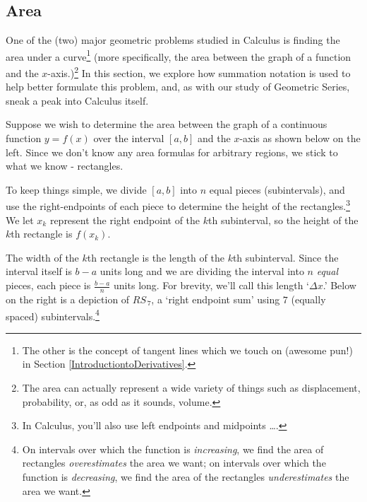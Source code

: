 \documentclass{ximera}
\begin{document}
\subsection{Area}
\label{AreabySum}

One of the (two) major geometric problems studied in Calculus is finding the area under a curve\footnote{The other is the concept of tangent lines which we touch on (awesome pun!) in Section \ref{IntroductiontoDerivatives}.}  (more specifically, the area between the graph of a function and the $x$-axis.)\footnote{The area can actually represent a wide variety of things such as displacement, probability, or, as odd as it sounds, volume.}  In this section, we explore how summation notation is used to help better formulate this problem, and, as with our study of Geometric Series, sneak a peak into Calculus itself.

\medskip

Suppose we wish to determine the area between the graph of a continuous function $y = f(x)$  over the interval  $[a,b]$ and the $x$-axis as shown below on the left.  Since we don't know any area formulas for arbitrary regions, we stick to what we know - rectangles.  

\medskip

To keep things simple, we  divide $[a,b]$ into $n$ equal pieces (subintervals), and use the right-endpoints of each piece to determine the height of the rectangles.\footnote{In Calculus, you'll also use left endpoints and midpoints \ldots.}  We let $x_{k}$ represent the right endpoint of the $k$th subinterval, so the height of the $k$th rectangle is $f(x_{k})$.  

\medskip

The width of the $k$th rectangle is the length of the $k$th subinterval.  Since the interval itself is $b-a$ units long and we are dividing the interval into $n$ \textit{equal} pieces, each piece is $\frac{b-a}{n}$  units long.  For brevity, we'll call this length  `$\Delta x$.'   Below on the right is a depiction of $RS_{\, 7}$, a `right endpoint sum' using $7$ (equally spaced) subintervals.\footnote{On intervals over which the function is \textit{increasing}, we find the area of rectangles \textit{overestimates} the area we want;  on intervals over which the function is \textit{decreasing}, we find the area of the rectangles \textit{underestimates} the area we want.}
\end{document}
